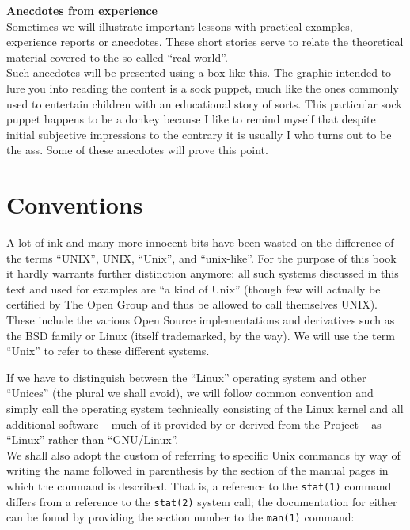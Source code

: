 \begin{experience}
{\bf Anecdotes from experience} \\
Sometimes we will illustrate important lessons with practical examples,
experience reports or anecdotes.  These short stories serve to relate the
theoretical material covered to the so-called ``real world''. \\[10pt]

Such anecdotes will be presented using a box like this.  The graphic
intended to lure you into reading the content is a sock puppet, much like
the ones commonly used to entertain children with an educational story of
sorts.  This particular sock puppet happens to be a donkey because I like
to remind myself that despite initial subjective impressions to the
contrary it is usually I who turns out to be the ass.  Some of these
anecdotes will prove this point.
\end{experience}


\section*{Conventions}

A lot of ink and many more innocent bits have been
wasted on the difference of the terms
``\textsc{UNIX}\textregistered{}'',
\textsc{UNIX}, ``Unix'', and ``unix-like''.  For the
purpose of this book it hardly warrants further
distinction anymore: all such systems discussed in
this text and used for examples are ``a kind of Unix''
(though few will actually be certified by The Open
Group and thus be allowed to
call themselves \textsc{UNIX}\textregistered).  These
include the various Open Source
implementations and derivatives such as the
BSD family or Linux (itself
trademarked, by the way).  We will use the term
``Unix'' to refer to these different systems.

If we have to distinguish between the ``Linux''
operating system and other ``Unices'' (the plural we
shall avoid), we will follow common convention and
simply call the operating system technically
consisting of the Linux kernel and all additional
software -- much of it provided by or derived from the
 Project -- as
``Linux'' rather than ``GNU/Linux''.
\\

We shall also adopt the custom of referring to
specific Unix commands by way of writing the name
followed in parenthesis by the section of the manual
pages in which the command is described.  That is, a
reference to the {\tt stat(1)} command differs from a
reference to the {\tt stat(2)} system call; the
documentation for either can be found by providing the
section number to the {\tt man(1)} command:

